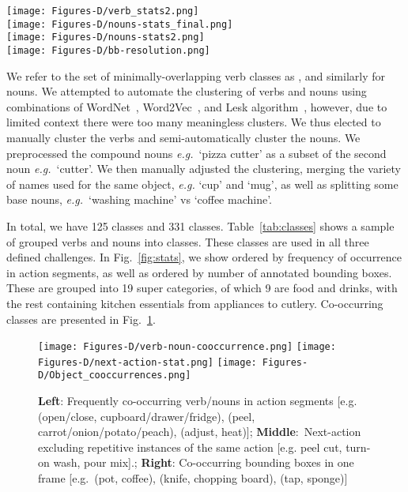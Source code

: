 \documentclass[runningheads]{llncs}
\begin{document}
\begin{figure*}[t]
\texttt{[image: Figures-D/verb\_stats2.png]}\\
\texttt{[image: Figures-D/nouns-stats\_final.png]}\\
\texttt{[image: Figures-D/nouns-stats2.png]}\\
\texttt{[image: Figures-D/bb-resolution.png]}
\caption{{\bf From Top}: Frequency of verb classes in action segments; Frequency of noun clusters in action segments, by category; Frequency of noun clusters in bounding box annotations, by category; Mean and standard deviation of bounding box, by category}
\label{fig:stats}
\end{figure*}

We refer to the set of minimally-overlapping verb classes as , and similarly  for nouns.
We attempted to automate the clustering of verbs and nouns using combinations of WordNet~\cite{miller1995wordnet}, Word2Vec~\cite{mikolov2013efficient}, and Lesk algorithm~\cite{Banerjee2002}, however, due to limited context there were too many meaningless clusters. We thus elected to manually cluster the verbs and semi-automatically cluster the nouns. We preprocessed the compound nouns \textit{e.g.}~`pizza cutter' as a subset of the second noun \textit{e.g.}~`cutter'. We then manually adjusted the clustering, merging the variety of names used for the same object, \textit{e.g.} `cup' and `mug', as well as splitting some base nouns, \textit{e.g.}~`washing machine' vs `coffee machine'.

In total, we have 125  classes and 331  classes. Table~\ref{tab:classes} shows a sample of grouped verbs and nouns into classes.
These classes are used in all three defined challenges.
In Fig.~\ref{fig:stats}, we show  ordered by frequency of occurrence in action segments, as well as  ordered by number of annotated bounding boxes. These are grouped into 19 super categories, of which 9 are food and drinks, with the rest containing kitchen essentials from appliances to cutlery. Co-occurring classes are presented in Fig.~\ref{fig:co-occur}.

\begin{figure}[t]
\vspace{-1mm}
{\texttt{[image: Figures-D/verb-noun-cooccurrence.png]}}
{\texttt{[image: Figures-D/next-action-stat.png]}}
{\texttt{[image: Figures-D/Object\_cooccurrences.png]}}
\vspace{-5mm}
\caption{\small {\bf Left}: Frequently co-occurring verb/nouns in action segments [e.g. (open/close, cupboard/drawer/fridge), (peel, carrot/onion/potato/peach), (adjust, heat)]; {\bf Middle}:~Next-action excluding repetitive instances of the same action [e.g. peel  cut, turn-on  wash, pour  mix].; {\bf Right}: Co-occurring bounding boxes in one frame [e.g.~(pot, coffee), (knife, chopping board), (tap, sponge)]}
\label{fig:co-occur}
\end{figure}
\end{document}
